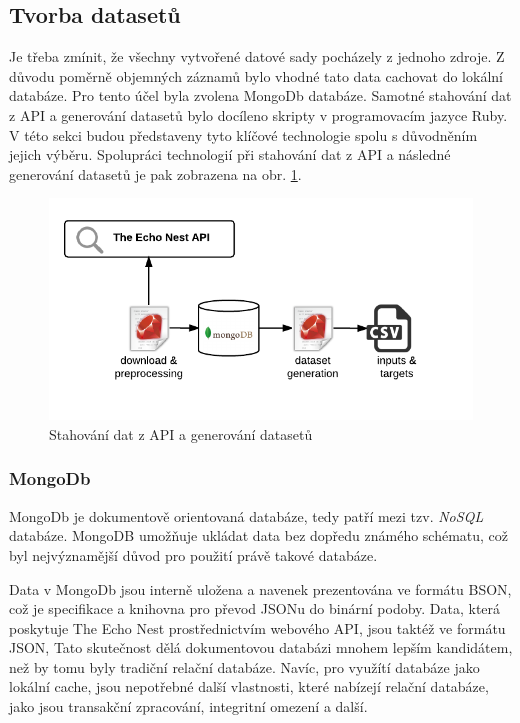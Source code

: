 \documentclass[thesis=M,czech]{FITthesis}[2012/06/26]
\begin{document}
\subsection{Tvorba datasetů}

Je třeba zmínit, že všechny vytvořené datové sady pocházely z jednoho zdroje. Z důvodu poměrně objemných záznamů bylo vhodné tato data cachovat do lokální databáze. Pro tento účel byla zvolena MongoDb databáze. Samotné stahování dat z API a generování datasetů bylo docíleno skripty v programovacím jazyce Ruby. V této sekci budou představeny tyto klíčové technologie spolu s důvodněním jejich výběru. Spolupráci technologií při stahování dat z API a následné generování datasetů je pak zobrazena na obr. \ref{fig:down}.

\begin{figure}[htbp]
\begin{center}
	\includegraphics[scale=1]{download_generate.png}
\caption{Stahování dat z API a generování datasetů}
\label{fig:down}
\end{center}
\end{figure}

\subsubsection*{MongoDb}
MongoDb je dokumentově orientovaná databáze, tedy patří mezi tzv. \textit{NoSQL} databáze. MongoDB umožňuje ukládat data bez dopředu známého schématu, což byl nejvýznamější důvod pro použití právě takové databáze.

Data v MongoDb jsou interně uložena a navenek prezentována ve formátu BSON, což je specifikace a knihovna pro převod JSONu do binární podoby. Data, která poskytuje The Echo Nest prostřednictvím webového API, jsou taktéž ve formátu JSON, Tato skutečnost dělá dokumentovou databázi mnohem lepším kandidátem, než by tomu byly tradiční relační databáze. Navíc, pro využítí databáze jako lokální cache, jsou nepotřebné další vlastnosti, které nabízejí relační databáze, jako jsou transakční zpracování, integritní omezení a další.
\end{document}
